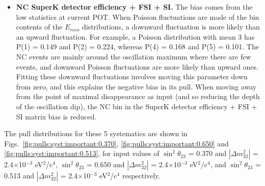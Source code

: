 \begin{itemize}
  of the predicted 1 $\mu$-like ring energy spectrum is not symmetric, and, consequently, a positive tweak of this parameter has a 
  different effect on that spectrum from a negative tweak (please see figure 46 in the supplement to this technical note). 
\item {\bf NC SuperK detector efficiency + FSI + SI.} 
  The bias comes from the low statistics at current POT.
  When Poisson fluctuations are made of the bin contents of the $E_{reco}$ distributions, a downward fluctuation is more likely than an upward
  fluctuation. For example, a Poisson distribution with mean 3 has P(1) = 0.149 and P(2) = 0.224, whereas P(4) = 0.168 and P(5) = 0.101. The 
  NC events are mainly around the oscillation maximum where there are few events, and downward Poisson fluctuations are more likely than upward 
  ones. Fitting these downward fluctuations involves moving this parameter down from zero, and this explains the negative bias in its pull. 
  When moving away from the point of maximal disappearance as input
  (and so reducing the depth of the oscillation dip),
  the NC bin in the SuperK detector efficiency + FSI + SI matrix bias is reduced.
\end{itemize}
The pull distributions for these 5 systematics are shown in Figs.\ 
\ref{fig:pulls:syst:important:0.370}, \ref{fig:pulls:syst:important:0.650} and \ref{fig:pulls:syst:important:0.513},
for input values of 
$\sin^{2}\theta_{23}$ = 0.370 and $|\Delta m^{2}_{32}|$ = 2.4$\times$10$^{-3}$ eV$^{2}$/c$^{4}$,
$\sin^{2}\theta_{23}$ = 0.650 and $|\Delta m^{2}_{32}|$ = 2.4$\times$10$^{-3}$ eV$^{2}$/c$^{4}$, and
$\sin^{2}\theta_{23}$ = 0.513 and $|\Delta m^{2}_{32}|$ = 2.4$\times$10$^{-3}$ eV$^{2}$/c$^{4}$ respectively.


